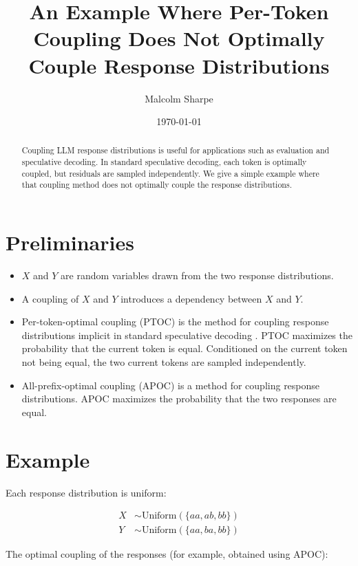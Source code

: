 \documentclass{article}
\title{An Example Where Per-Token Coupling Does Not Optimally Couple Response Distributions}
\author{Malcolm Sharpe}
\date{\today}
\begin{document}
\maketitle

\begin{abstract}
Coupling LLM response distributions is useful for applications such as evaluation and speculative decoding. In standard speculative decoding, each token is optimally coupled, but residuals are sampled independently. We give a simple example where that coupling method does not optimally couple the response distributions.
\end{abstract}

\section*{Preliminaries}

\begin{itemize}
    \item \(X\) and \(Y\) are random variables drawn from the two response distributions.
    \item A coupling of \(X\) and \(Y\) introduces a dependency between \(X\) and \(Y\).
    \item Per-token-optimal coupling (PTOC) is the method for coupling response distributions implicit in standard speculative decoding \cite{leviathan2023fast} \cite{chen2023acceleratinglargelanguagemodel}. PTOC maximizes the probability that the current token is equal. Conditioned on the current token not being equal, the two current tokens are sampled independently.
    \item All-prefix-optimal coupling (APOC) is a method for coupling response distributions. APOC maximizes the probability that the two responses are equal.
\end{itemize}

\section*{Example}

Each response distribution is uniform:

\begin{align*}
    X &\sim \text{Uniform}(\{aa, ab, bb\}) \\
    Y &\sim \text{Uniform}(\{aa, ba, bb\})
\end{align*}

The optimal coupling of the responses (for example, obtained using APOC):
\end{document}
